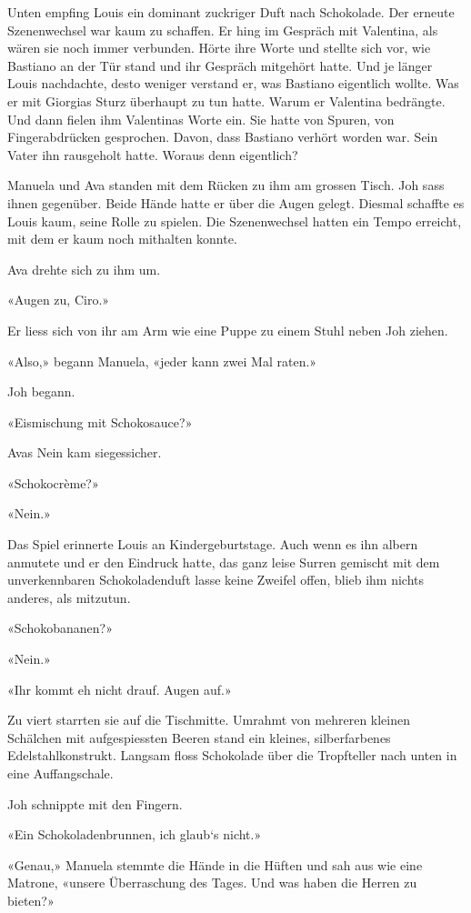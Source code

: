 Unten empfing Louis ein dominant zuckriger Duft nach Schokolade. Der
erneute Szenenwechsel war kaum zu schaffen. Er hing im Gespräch mit
Valentina, als wären sie noch immer verbunden. Hörte ihre Worte und
stellte sich vor, wie Bastiano an der Tür stand und ihr Gespräch
mitgehört hatte. Und je länger Louis nachdachte, desto weniger verstand
er, was Bastiano eigentlich wollte. Was er mit Giorgias Sturz überhaupt
zu tun hatte. Warum er Valentina bedrängte. Und dann fielen ihm
Valentinas Worte ein. Sie hatte von Spuren, von Fingerabdrücken
gesprochen. Davon, dass Bastiano verhört worden war. Sein Vater ihn
rausgeholt hatte. Woraus denn eigentlich?

Manuela und Ava standen mit dem Rücken zu ihm am grossen Tisch. Joh sass
ihnen gegenüber. Beide Hände hatte er über die Augen gelegt. Diesmal
schaffte es Louis kaum, seine Rolle zu spielen. Die Szenenwechsel hatten
ein Tempo erreicht, mit dem er kaum noch mithalten konnte.

Ava drehte sich zu ihm um.

«Augen zu, Ciro.»

Er liess sich von ihr am Arm wie eine Puppe zu einem Stuhl neben Joh
ziehen.

«Also,» begann Manuela, «jeder kann zwei Mal raten.»

Joh begann.

«Eismischung mit Schokosauce?»

Avas Nein kam siegessicher.

«Schokocrème?»

«Nein.»

Das Spiel erinnerte Louis an Kindergeburtstage. Auch wenn es ihn albern
anmutete und er den Eindruck hatte, das ganz leise Surren gemischt mit
dem unverkennbaren Schokoladenduft lasse keine Zweifel offen, blieb ihm
nichts anderes, als mitzutun.

«Schokobananen?»

«Nein.»

«Ihr kommt eh nicht drauf. Augen auf.»

Zu viert starrten sie auf die Tischmitte. Umrahmt von mehreren kleinen
Schälchen mit aufgespiessten Beeren stand ein kleines, silberfarbenes
Edelstahlkonstrukt. Langsam floss Schokolade über die Tropfteller nach
unten in eine Auffangschale.

Joh schnippte mit den Fingern.

«Ein Schokoladenbrunnen, ich glaub`s nicht.»

«Genau,» Manuela stemmte die Hände in die Hüften und sah aus wie eine
Matrone, «unsere Überraschung des Tages. Und was haben die Herren zu
bieten?»

